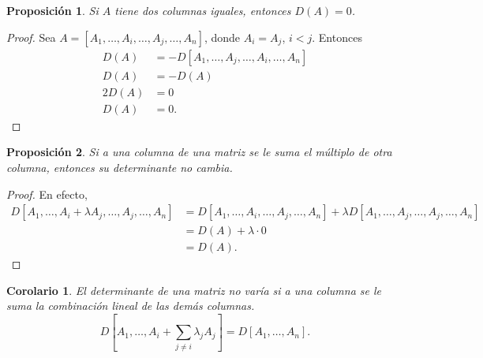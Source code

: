 \documentclass[b5paper, 11pt]{book}
\newcommand{\0}{\mathbf{0}}
\theoremstyle{estiloB}
\theoremstyle{estiloC}
\theoremstyle{estiloD}
\newtheorem{proposition}{Proposición}[section]
\newtheorem{corollary}{Corolario}[section]
\begin{document}
\begin{proposition}\label{prop:2}
	Si $A$ tiene dos columnas iguales, entonces $D\left(A\right)=0$.
\end{proposition}
\begin{proof}
	Sea $A=\left[A_{1},\ldots, A_{i},\ldots,A_{j},\ldots,A_{n}\right]$, donde $A_{i}=A_{j}$, $i<j$. Entonces
	\begin{align*}
	D\left(A\right)	&=-D\left[A_{1},\ldots,A_{j},\ldots,A_{i},\ldots, A_{n}\right]\\
	D\left(A\right)	&=-D\left(A\right)\\
	2D\left(A\right)&= 0\\
	D\left(A\right)	&= 0.
	\end{align*}
\end{proof}
\begin{proposition}\label{prop:3}
	Si a una columna de una matriz se le suma el múltiplo de otra columna, entonces su determinante no cambia.
\end{proposition}
\begin{proof}
	En efecto,
	\begin{align*}
	D\left[A_{1},\ldots, A_{i}+\lambda A_{j},\ldots,A_{j},\ldots,A_{n}\right]	&= D\left[A_{1},\ldots,A_{i},\ldots,A_{j},\ldots,A_{n}\right]+\lambda D\left[A_{1},\ldots,A_{j},\ldots,A_{j},\ldots,A_{n}\right]\\
	&=D\left(A\right)+\lambda\cdot0\\
	&=D\left(A\right).
	\end{align*}
\end{proof}
\begin{corollary}
	El determinante de una matriz no varía si a una columna se le suma la combinación lineal de las demás columnas. \[ D\left[A_{1},\ldots, A_{i}+\sum_{j\neq i}\lambda_{j}A_{j}\right]=D\left[A_{1},\ldots,A_{n}\right]. \]
\end{corollary}
\end{document}
